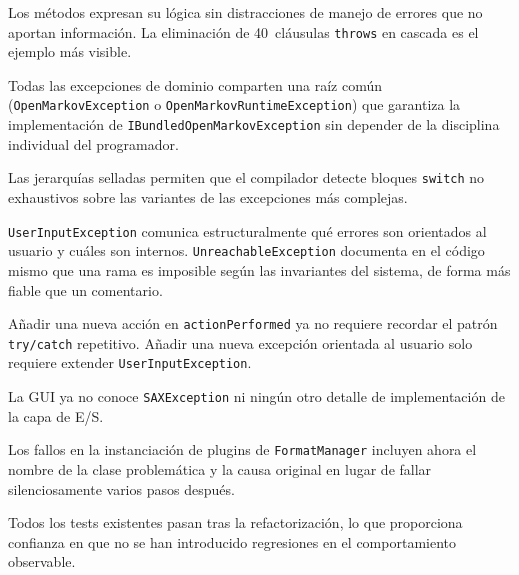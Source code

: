 \documentclass[12pt,a4paper]{article}
\begin{document}
\begin{description}[leftmargin=2em]
  \item[Legibilidad] Los métodos expresan su lógica sin distracciones de manejo
    de errores que no aportan información. La eliminación de 40~cláusulas
    \texttt{throws} en cascada es el ejemplo más visible.

  \item[Coherencia del modelo de errores] Todas las excepciones de dominio
    comparten una raíz común (\texttt{OpenMarkovException} o
    \texttt{OpenMarkovRuntimeException}) que garantiza la implementación de
    \texttt{IBundledOpenMarkovException} sin depender de la disciplina individual
    del programador.

  \item[Seguridad estática] Las jerarquías selladas permiten que el compilador
    detecte bloques \texttt{switch} no exhaustivos sobre las variantes de las
    excepciones más complejas.

  \item[Expresividad de intención] \texttt{UserInputException} comunica
    estructuralmente qué errores son orientados al usuario y cuáles son internos.
    \texttt{UnreachableException} documenta en el código mismo que una rama es
    imposible según las invariantes del sistema, de forma más fiable que un
    comentario.

  \item[Mantenibilidad] Añadir una nueva acción en \texttt{actionPerformed} ya
    no requiere recordar el patrón \texttt{try/catch} repetitivo. Añadir una nueva
    excepción orientada al usuario solo requiere extender
    \texttt{UserInputException}.

  \item[Separación de capas] La GUI ya no conoce \texttt{SAXException} ni ningún
    otro detalle de implementación de la capa de E/S.

  \item[Diagnóstico de errores] Los fallos en la instanciación de plugins de
    \texttt{FormatManager} incluyen ahora el nombre de la clase problemática y la
    causa original en lugar de fallar silenciosamente varios pasos después.
\end{description}

Todos los tests existentes pasan tras la refactorización, lo que proporciona
confianza en que no se han introducido regresiones en el comportamiento observable.
\end{document}
